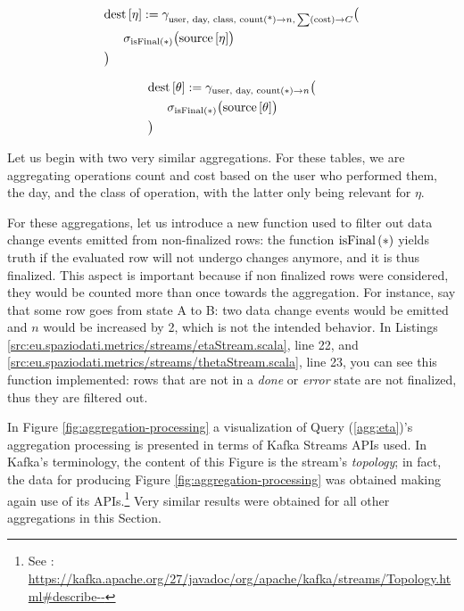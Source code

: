 \begin{align}\label{agg:eta}
	&\dest{\eta} := \gamma_{\text{user, day, class, count(*)} \rightarrow n \text{,} \sum (\text{cost}) \rightarrow C} \bigl( \\
	&\ind \sigma_{\isfinal{*}}\bigl( \source{\eta} \bigr) \nonumber\\
	&\bigr) \nonumber
\end{align}

\begin{align}\label{agg:theta}
	&\dest{\theta} := \gamma_{\text{user, day, count} (*) \rightarrow n} \bigl( \\
	&\ind \sigma_{\isfinal{*}}\bigl( \source{\theta} \bigr) \nonumber \\
	&\bigr) \nonumber
\end{align}

Let us begin with two very similar aggregations.
For these tables, we are aggregating operations count and cost based on the user who performed them, the day, and the class of operation, with the latter only being relevant for $\eta$.

For these aggregations, let us introduce a new function used to filter out data change events emitted from non-finalized rows: the function $\text{isFinal}\left({*}\right)$ yields truth if the evaluated row will not undergo changes anymore, and it is thus finalized.
This aspect is important because if non finalized rows were considered, they would be counted more than once towards the aggregation.
For instance, say that some row goes from state A to B: two data change events would be emitted and $n$ would be increased by 2, which is not the intended behavior.
In Listings \ref{src:eu.spaziodati.metrics/streams/etaStream.scala}, line 22, and \ref{src:eu.spaziodati.metrics/streams/thetaStream.scala}, line 23, you can see this function implemented: rows that are not in a \emph{done} or \emph{error} state are not finalized, thus they are filtered out.

In Figure \ref{fig:aggregation-processing} a visualization of Query (\ref{agg:eta})'s aggregation processing is presented in terms of Kafka Streams APIs used.
In Kafka's terminology, the content of this Figure is the stream's \emph{topology}; in fact, the data for producing Figure \ref{fig:aggregation-processing} was obtained making again use of its APIs.\footnote{%
	See \cite[Topology\#describe]{kafka-javadocs}: 	\url{https://kafka.apache.org/27/javadoc/org/apache/kafka/streams/Topology.html\#describe--}\lastvisited
}
Very similar results were obtained for all other aggregations in this Section.

